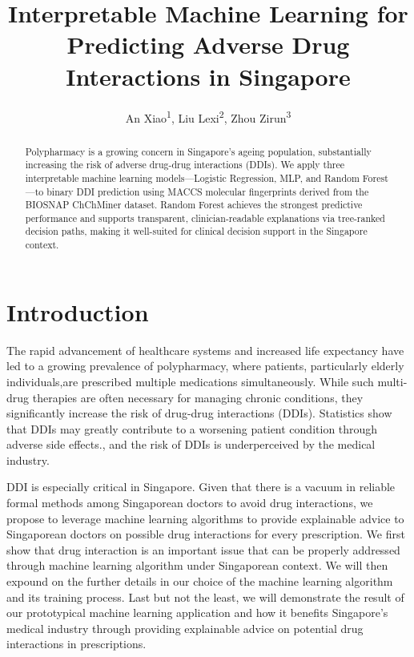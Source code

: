 \documentclass[letterpaper]{article} %
\title{Interpretable Machine Learning for Predicting Adverse Drug Interactions in Singapore}
\author{
    An Xiao\textsuperscript{\rm 1},
    Liu Lexi\textsuperscript{\rm 2},
    Zhou Zirun\textsuperscript{\rm 3}
}
\begin{document}
\maketitle

\begin{abstract}
Polypharmacy is a growing concern in Singapore's ageing population, substantially increasing the risk of adverse drug-drug interactions (DDIs). We apply three interpretable machine learning models---Logistic Regression, MLP, and Random Forest---to binary DDI prediction using MACCS molecular fingerprints derived from the BIOSNAP ChChMiner dataset. Random Forest achieves the strongest predictive performance and supports transparent, clinician-readable explanations via tree-ranked decision paths, making it well-suited for clinical decision support in the Singapore context.
\end{abstract}

\section{Introduction}

The rapid advancement of healthcare systems and increased life expectancy have led to a growing prevalence of polypharmacy, where patients, particularly elderly individuals,are prescribed multiple medications simultaneously. While such multi-drug therapies are often necessary for managing chronic conditions, they significantly increase the risk of drug-drug interactions (DDIs). Statistics show that DDIs may greatly contribute to a worsening patient condition through adverse side effects.\cite{Chan2016:chan}, and the risk of DDIs is underperceived by the medical industry.\cite{polypharmacy}

DDI is especially critical in Singapore.\cite{Ho2023} Given that there is a vacuum in reliable formal methods among Singaporean doctors to avoid drug interactions, we propose to leverage machine learning algorithms to provide explainable advice to Singaporean doctors on possible drug interactions for every prescription. We first show that drug interaction is an important issue that can be properly addressed through machine learning algorithm under Singaporean context. We will then expound on the further details in our choice of the machine learning algorithm and its training process. Last but not the least, we will demonstrate the result of our prototypical machine learning application and how it benefits Singapore's medical industry through providing explainable advice on potential drug interactions in prescriptions.
\end{document}
